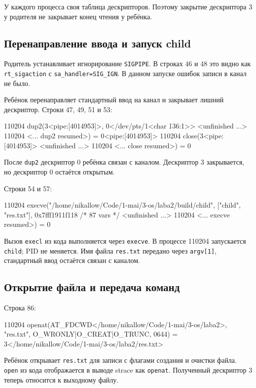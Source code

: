 \documentclass[12pt,a4paper]{article}
\begin{document}
У каждого процесса своя таблица дескрипторов. Поэтому закрытие дескриптора 3 у родителя не закрывает конец чтения у ребёнка.

\subsection{Перенаправление ввода и запуск child}
Родитель устанавливает игнорирование \texttt{SIGPIPE}. В строках 46 и 48 это видно как \texttt{rt\_sigaction} с \texttt{sa\_handler=SIG\_IGN}. В данном запуске ошибок записи в канал не было.

Ребёнок перенаправляет стандартный ввод на канал и закрывает лишний дескриптор. Строки 47, 49, 51 и 53:
\begin{terminal}
110204 dup2(3<pipe:[4014953]>, 0</dev/pts/1<char 136:1>> <unfinished ...>
110204 <... dup2 resumed>)              = 0<pipe:[4014953]>
110204 close(3<pipe:[4014953]> <unfinished ...>
110204 <... close resumed>)             = 0
\end{terminal}

После \texttt{dup2} дескриптор 0 ребёнка связан с каналом. Дескриптор 3 закрывается, но дескриптор 0 остаётся открытым.

Строки 54 и 57:
\begin{terminal}
110204 execve("/home/nikallow/Code/1-mai/3-os/laba2/build/child", ["child", "res.txt"], 0x7fff1911f118 /* 87 vars */ <unfinished ...>
110204 <... execve resumed>)            = 0
\end{terminal}

Вызов \texttt{execl} из кода выполняется через \texttt{execve}. В процессе 110204 запускается \texttt{child}; PID не меняется. Имя файла \texttt{res.txt} передано через \texttt{argv[1]}, стандартный ввод остаётся связан с каналом.

\subsection{Открытие файла и передача команд}
Строка 86:
\begin{terminal}
110204 openat(AT_FDCWD</home/nikallow/Code/1-mai/3-os/laba2>, "res.txt", O_WRONLY|O_CREAT|O_TRUNC, 0644) = 3</home/nikallow/Code/1-mai/3-os/laba2/res.txt>
\end{terminal}

Ребёнок открывает \texttt{res.txt} для записи с флагами создания и очистки файла. \texttt{open} из кода отображается в выводе strace как \texttt{openat}. Полученный дескриптор 3 теперь относится к выходному файлу.
\end{document}
